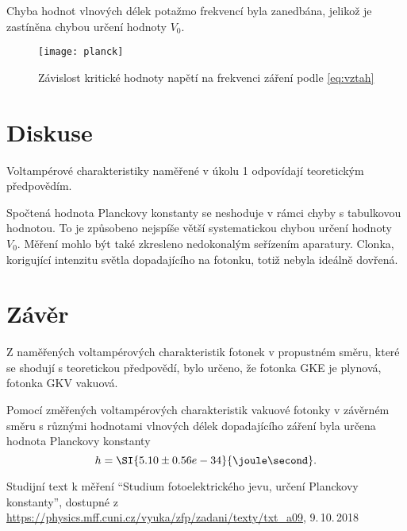 \documentclass{protokol}
\begin{document}
    Chyba hodnot vlnových délek potažmo frekvencí byla zanedbána, jelikož je zastíněna chybou určení hodnoty $V_0$.

    \begin{figure}[H]
      \centering
      \texttt{[image: planck]}
      \caption{Závislost kritické hodnoty napětí na frekvenci záření podle \eqref{eq:vztah}}
      \label{fig:planck} 
    \end{figure}


  \section*{Diskuse}

    Voltampérové charakteristiky naměřené v úkolu 1 odpovídají teoretickým předpovědím.

    Spočtená hodnota Planckovy konstanty se neshoduje v rámci chyby s tabulkovou hodnotou. To je způsobeno nejspíše větší systematickou chybou určení hodnoty $V_0$. Měření mohlo být také zkresleno nedokonalým seřízením aparatury. Clonka, korigující intenzitu světla dopadajícího na fotonku, totiž nebyla ideálně dovřená.

  \section*{Závěr}

    Z naměřených voltampérových charakteristik fotonek v propustném směru, které se shodují s teoretickou předpovědí, bylo určeno, že fotonka GKE je plynová, fotonka GKV vakuová.

    Pomocí změřených voltampérových charakteristik vakuové fotonky v závěrném směru s různými hodnotami vlnových délek dopadajícího záření byla určena hodnota Planckovy konstanty  
    $$ h = \SI{5.10 \pm 0.56 e-34}{\joule\second}. $$

  \begin{thebibliography}{} 
 
    Studijní text k měření ``Studium fotoelektrického jevu, určení Planckovy konstanty'', dostupné z\\ \url{https://physics.mff.cuni.cz/vyuka/zfp/zadani/texty/txt_a09}, 9.\,10.\,2018
   
  \end{thebibliography}
\end{document}
